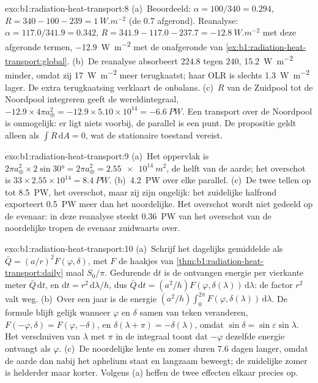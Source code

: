 \begin{solution}{exo:b1:radiation-heat-transport:8}
(a)~Beoordeeld: $\alpha = 100/340 = 0.294$, $R = 340 - 100 - 239 =
\qty{+1}{W.m^{-2}}$ (de \num{0.7} afgerond). Reanalyse: $\alpha = 117.0/341.9 =
0.342$, $R = 341.9 - 117.0 - 237.7 = \qty{-12.8}{W.m^{-2}}$ met deze afgeronde
termen, \qty{-12.9}{W.m^{-2}} met de onafgeronde van
\cref{ex:b1:radiation-heat-transport:global}. (b)~De reanalyse
absorbeert $224.8$ tegen $240$, \qty{15.2}{W.m^{-2}} minder, omdat zij \qty{17}{W.m^{-2}}
meer terugkaatst; haar OLR is slechts \qty{1.3}{W.m^{-2}} lager. De extra terugkaatsing verklaart de onbalans. (c)~$R$ van de Zuidpool tot de
Noordpool integreren geeft de wereldintegraal, $-12.9 \times 4\pi a_\oplus^2 = -12.9 \times
5.10\times10^{14} = \qty{-6.6}{PW}$. Een transport over de Noordpool is
onmogelijk: er ligt niets voorbij, de parallel is een punt. De propositie
geldt alleen als $\int R\,\mathrm dA = 0$, wat de stationaire toestand vereist.
\end{solution}

\begin{solution}{exo:b1:radiation-heat-transport:9}
(a)~Het oppervlak is $2\pi a_\oplus^2 \times 2\sin\ang{30} = 2\pi a_\oplus^2 =
\qty{2.55e14}{m^2}$, de helft van de aarde; het overschot is $33 \times 2.55\times10^{14} =
\qty{8.4}{PW}$. (b)~\qty{4.2}{PW} over elke parallel. (c)~De twee tellen op tot
\qty{8.5}{PW}, het overschot, maar zij zijn ongelijk: het zuidelijke halfrond exporteert
\qty{0.5}{PW} meer dan het noordelijke. Het overschot wordt niet gedeeld op de evenaar: in deze reanalyse steekt \qty{0.36}{PW} van het overschot van de noordelijke tropen de evenaar zuidwaarts over.
\end{solution}

\begin{solution}{exo:b1:radiation-heat-transport:10}
(a)~Schrijf het dagelijks gemiddelde als $\bar Q = (a/r)^2 F(\varphi, \delta)$, met $F$ de
haakjes van \cref{thm:b1:radiation-heat-transport:daily} maal $S_0/\pi$. Gedurende
$\mathrm dt$ is de ontvangen energie per vierkante meter $\bar Q\,\mathrm dt$, en
$\mathrm dt = r^2\,\mathrm d\lambda/h$, dus $\bar Q\,\mathrm dt = (a^2/h)
F(\varphi, \delta(\lambda))\,\mathrm d\lambda$: de factor $r^2$ valt weg.
(b)~Over een jaar is de energie $(a^2/h)\int_0^{2\pi} F(\varphi,
\delta(\lambda))\,\mathrm d\lambda$. De formule blijft gelijk wanneer $\varphi$ en
$\delta$ samen van teken veranderen, $F(-\varphi, \delta) = F(\varphi, -\delta)$, en
$\delta(\lambda + \pi) = -\delta(\lambda)$, omdat $\sin\delta = \sin\varepsilon
\sin\lambda$. Het verschuiven van $\lambda$ met $\pi$ in de integraal toont dat $-\varphi$
dezelfde energie ontvangt als $\varphi$. (c)~De noordelijke lente en zomer duren
\num{7.6} dagen langer, omdat de aarde dan nabij het aphelium staat en langzaam beweegt; de
zuidelijke zomer is helderder maar korter. Volgens (a) heffen de twee effecten elkaar precies op.
\end{solution}

